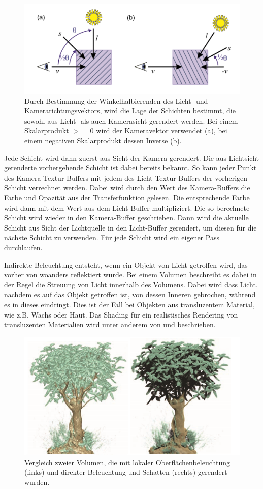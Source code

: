 \begin{figure}[!htb]
	\centering
	\includegraphics[width=0.7\linewidth]{images/halfAngleSlice.png}
	\caption{Durch Bestimmung der Winkelhalbierenden des Licht- und Kamerarichtungsvektors, wird die Lage der Schichten bestimmt, die sowohl aus Licht- als auch Kamerasicht gerendert werden. Bei einem Skalarprodukt $>=0$ wird der Kameravektor verwendet (a), bei einem negativen Skalarprodukt dessen Inverse (b).}
	\label{img:halfAngleSlice}
\end{figure}
\FloatBarrier

Jede Schicht wird dann zuerst aus Sicht der Kamera gerendert. Die aus Lichtsicht gerenderte vorhergehende Schicht ist dabei bereits bekannt. So kann jeder Punkt des Kamera-Textur-Buffers mit jedem des Licht-Textur-Buffers der vorherigen Schicht verrechnet werden. Dabei wird durch den Wert des Kamera-Buffers die Farbe und Opazität aus der Transferfunktion gelesen. Die entsprechende Farbe wird dann mit dem Wert aus dem Licht-Buffer multipliziert. Die so berechnete Schicht wird wieder in den Kamera-Buffer geschrieben. Dann wird die aktuelle Schicht aus Sicht der Lichtquelle in den Licht-Buffer gerendert, um diesen für die nächste Schicht zu verwenden.
Für jede Schicht wird ein eigener Pass durchlaufen.

Indirekte Beleuchtung entsteht, wenn ein Objekt von Licht getroffen wird, das vorher von woanders reflektiert wurde. Bei einem Volumen beschreibt es dabei in der Regel die Streuung von Licht innerhalb des Volumens. Dabei wird dass Licht, nachdem es auf das Objekt getroffen ist, von dessen Inneren gebrochen, während es in dieses eindringt. Dies ist der Fall bei Objekten aus transluzentem Material, wie z.B. Wachs oder Haut.
Das Shading für ein realistisches Rendering von transluzenten Materialien wird unter anderem von \cite{hansen02} und \cite{Hadwiger06} beschrieben.
\begin{figure}[!htb]
	\centering
	\includegraphics[width=0.7\linewidth]{images/localGlobalIllumination.png}
	\caption{Vergleich zweier Volumen, die mit lokaler Oberflächenbeleuchtung (links) und direkter Beleuchtung und Schatten (rechts) gerendert wurden.}
	\label{img:localGlobalIll}
\end{figure}
\FloatBarrier

